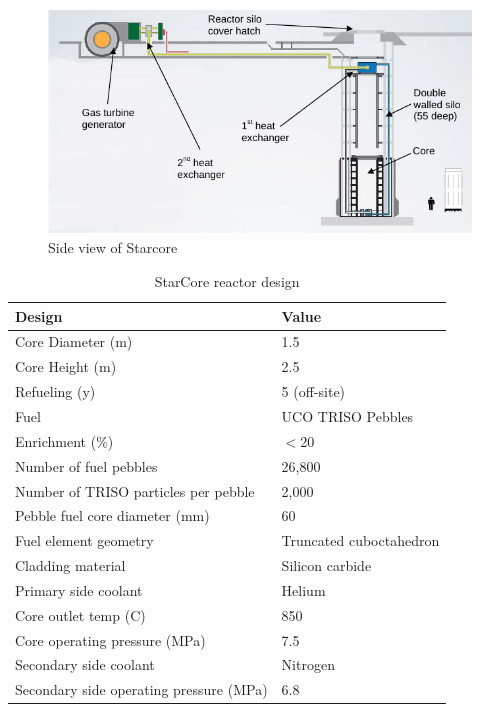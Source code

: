 \begin{figure}[htbp]
\centering
\includegraphics[scale=0.7]{Figs/starcoreview.jpeg}
\caption{Side view of Starcore}
\label{Starview}
\end{figure}

\begin{table} [ht]
\begin{center}

\caption{ StarCore reactor design}
\label{startable}
\begin{tabular}{l l}
\hline 
Design 		&Value \\ 
\hline 
Core Diameter (m) 		&1.5 \\ 
Core Height (m) 		&2.5 \\ 
Refueling (y)		&  5 (off-site)\\ 
Fuel		&UCO TRISO Pebbles \\ 
Enrichment (\%)		&$<$20 \\ 
Number of fuel pebbles		&26,800 \\ 
Number of TRISO particles per pebble		&2,000 \\ 
Pebble fuel core diameter (mm)		&60 \\ 
Fuel element geometry & Truncated cuboctahedron\\ 
Cladding material & Silicon carbide \\ 
Primary side coolant 	&Helium \\ 
Core outlet temp (C) 	&850 \\ 
Core operating pressure (MPa)	&7.5 \\ 
Secondary side coolant	&Nitrogen \\ 
Secondary side operating pressure (MPa)	&6.8 \\ 
\hline 

\end{tabular}
\end{center}
\end{table}

